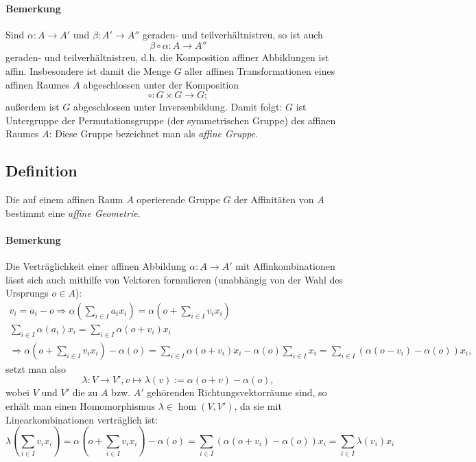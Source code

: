 \paragraph{Bemerkung}
	Sind $ \alpha:A \to A' $ und $ \beta:A'\to A'' $ geraden- und teilverhältnistreu, so ist auch
		\[ \beta\circ\alpha:A\to A'' \]
	geraden- und teilverhältnistreu, d.h. die Komposition affiner Abbildungen ist affin. Insbesondere ist damit die Menge $ G $ aller affinen Transformationen eines affinen Raumes $ A $ abgeschlossen unter der Komposition
		\[ \circ: G\times G\to G; \]
	außerdem ist $ G $ abgeschlossen unter Inversenbildung. Damit folgt: $ G $ ist Untergruppe der Permutationsgruppe (der symmetrischen Gruppe) des affinen Raumes $ A $: Diese Gruppe bezeichnet man als \emph{affine Gruppe}.
\subsection{Definition}
	\begin{Definition}
	Die auf einem affinen Raum $ A $ operierende Gruppe $ G $ der Affinitäten von $ A $ bestimmt eine \emph{affine Geometrie}.
	\end{Definition}
	
\paragraph{Bemerkung}
	Die Verträglichkeit einer affinen Abbildung $ \alpha:A\to A' $ mit Affinkombinationen lässt sich auch mithilfe von Vektoren formulieren (unabhängig von der Wahl des Ursprungs $ o \in A$):
		\begin{gather*}
		v_i = a_i-o \Rightarrow \alpha\left(\sum_{i\in I}a_ix_i\right)=\alpha\left(o+\sum_{i\in I}v_ix_i\right)\\
		\sum_{i\in I}\alpha(a_i)x_i = \sum_{i\in I}\alpha(o+v_i)x_i\\
		\Rightarrow \alpha\left(o+\sum_{i\in I}v_ix_i\right)-\alpha(o) = \sum_{i\in I}\alpha(o+v_i)x_i-\alpha(o)\sum_{i\in I}x_i = \sum_{i\in I}(\alpha(o-v_i)-\alpha(o))x_i,
		\end{gather*}
	setzt man also
		\[ \lambda:V\to V',v\mapsto \lambda(v):= \alpha(o+v)-\alpha(o),  \]
	wobei $ V $ und $ V' $ die zu $ A $ bzw. $ A' $ gehörenden Richtungsvektorräume sind, so erhält man einen Homomorphismus $ \lambda\in \hom(V,V') $, da sie mit Linearkombinationen verträglich ist:
		\[ \lambda\left(\sum_{i\in I}v_ix_i\right)=\alpha\left(o+\sum_{i\in I}v_ix_i\right)-\alpha(o)= \sum_{i\in I}\left(\alpha(o+v_i)-\alpha(o)\right)x_i = \sum_{i\in I}\lambda(v_i)x_i\]
		
